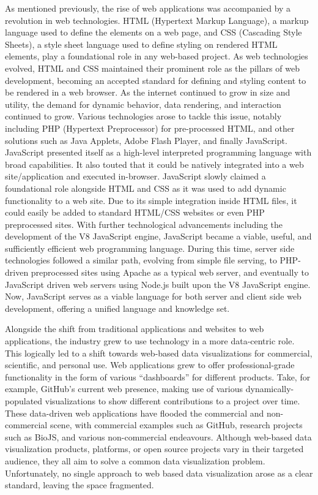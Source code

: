 As mentioned previously, the rise of web applications was accompanied by a revolution in web technologies.  HTML (Hypertext Markup Language), a markup language used to define the elements on a web page, and CSS (Cascading Style Sheets), a style sheet language used to define styling on rendered HTML elements, play a foundational role in any web-based project.  As web technologies evolved, HTML and CSS maintained their prominent role as the pillars of web development, becoming an accepted standard for defining and styling content to be rendered in a web browser.  As the internet continued to grow in size and utility, the demand for dynamic behavior, data rendering, and interaction continued to grow.  Various technologies arose to tackle this issue, notably including PHP (Hypertext Preprocessor) for pre-processed HTML, and other solutions such as Java Applets, Adobe Flash Player, and finally JavaScript.  JavaScript presented itself as a high-level interpreted programming language with broad capabilities.  It also touted that it could be natively integrated into a web site/application and executed in-browser.  JavaScript slowly claimed a foundational role alongside HTML and CSS as it was used to add dynamic functionality to a web site.  Due to its simple integration inside HTML files, it could easily be added to standard HTML/CSS websites or even PHP preprocessed sites.  With further technological advancements including the development of the V8 JavaScript engine, JavaScript became a viable, useful, and sufficiently efficient web programming language. During this time, server side technologies followed a similar path, evolving from simple file serving, to PHP-driven preprocessed sites using Apache as a typical web server, and eventually to JavaScript driven web servers using Node.js built upon the V8 JavaScript engine.  Now, JavaScript serves as a viable language for both server and client side web development, offering a unified language and knowledge set. \par
Alongside the shift from traditional applications and websites to web applications, the industry grew to use technology in a more data-centric role.  This logically led to a shift towards web-based data visualizations for commercial, scientific, and personal use.  Web applications grew to offer professional-grade functionality in the form of various “dashboards” for different products.  Take, for example, GitHub’s current web presence, making use of various dynamically-populated visualizations to show different contributions to a project over time.  These data-driven web applications have flooded the commercial and non-commercial scene, with commercial examples such as GitHub, research projects such as BioJS, and various non-commercial endeavours.  Although web-based data visualization products, platforms, or open source projects vary in their targeted audience, they all aim to solve a common data visualization problem.  Unfortunately, no single approach to web based data visualization arose as a clear standard, leaving the space fragmented. \par
